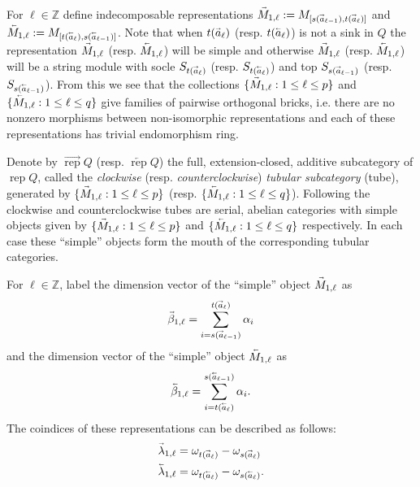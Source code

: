 \documentclass[12pt]{amsart}
\newcommand{\ZZ}{\mathbb{Z}}
\newcommand{\rep}{\operatorname{rep}}
\renewcommand{\vec}[1]{\accentset{\shortrightarrow}{#1}}
\newcommand{\cev}[1]{\accentset{\shortleftarrow}{#1}}
\numberwithin{equation}{section}
\begin{document}
  For $\ell\in\ZZ$ define indecomposable representations $\vec{M}_{1,\ell}:=M_{[s(\vec{a}_{\ell-1}),t(\vec{a}_\ell)]}$ and $\cev{M}_{1,\ell}:=M_{[t(\cev{a}_\ell),s(\cev{a}_{\ell-1})]}$.  Note that when $t(\vec{a}_\ell)$ (resp. $t(\cev{a}_\ell)$) is not a sink in $Q$ the representation $\vec{M}_{1,\ell}$ (resp. $\cev{M}_{1,\ell}$) will be simple and otherwise $\vec{M}_{1,\ell}$ (resp. $\cev{M}_{1,\ell}$) will be a string module with socle $S_{t(\vec{a}_\ell)}$ (resp. $S_{t(\cev{a}_\ell)}$) and top $S_{s(\vec{a}_{\ell-1})}$ (resp. $S_{s(\cev{a}_{\ell-1})}$).  From this we see that the collections $\{\vec{M}_{1,\ell}:1\le\ell\le p\}$ and $\{\cev{M}_{1,\ell}:1\le\ell\le q\}$ give families of pairwise orthogonal bricks, i.e. there are no nonzero morphisms between non-isomorphic representations and each of these representations has trivial endomorphism ring.

  Denote by $\overrightarrow{\rep}Q$ (resp. $\overleftarrow{\rep}Q$) the full, extension-closed, additive subcategory of $\rep Q$, called the \emph{clockwise} (resp. \emph{counterclockwise}) \emph{tubular subcategory} (tube), generated by $\{\vec{M}_{1,\ell}:1\le\ell\le p\}$ (resp. $\{\cev{M}_{1,\ell}:1\le\ell\le q\}$).  Following \cite[Section 3.1]{Rin84} the clockwise and counterclockwise tubes are serial, abelian categories with simple objects given by $\{\vec{M}_{1,\ell}:1\le\ell\le p\}$ and $\{\cev{M}_{1,\ell}:1\le\ell\le q\}$ respectively.  In each case these ``simple'' objects form the mouth of the corresponding tubular categories.

  For $\ell\in\ZZ$, label the dimension vector of the ``simple'' object $\vec{M}_{1,\ell}$ as
  \begin{equation}
    \vec{\beta}_{1,\ell}=\sum_{i=s(\vec{a}_{\ell-1})}^{t(\vec{a}_\ell)}\alpha_i
  \end{equation}
  and the dimension vector of the ``simple'' object $\cev{M}_{1,\ell}$ as
  \begin{equation}
    \cev{\beta}_{1,\ell}=\sum_{i=t(\cev{a}_\ell)}^{s(\cev{a}_{\ell-1})}\alpha_i.
  \end{equation}
  The coindices of these representations can be described as follows:
  \begin{align}
    \vec{\lambda}_{1,\ell}&=\omega_{t(\vec{a}_\ell)}-\omega_{s(\vec{a}_\ell)}\\
    \cev{\lambda}_{1,\ell}&=\omega_{t(\cev{a}_\ell)}-\omega_{s(\cev{a}_\ell)}.
  \end{align}
\end{document}
